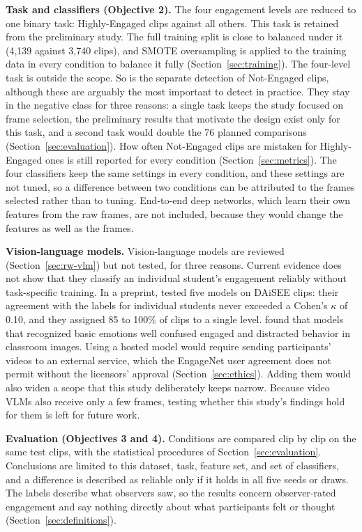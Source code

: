 \textbf{Task and classifiers (Objective 2).} The four engagement levels are reduced to one binary task: Highly-Engaged clips against all others. This task is retained from the preliminary study. The full training split is close to balanced under it (4,139 against 3,740 clips), and SMOTE oversampling \cite{chawla2002} is applied to the training data in every condition to balance it fully (Section~\ref{sec:training}). The four-level task is outside the scope. So is the separate detection of Not-Engaged clips, although these are arguably the most important to detect in practice. They stay in the negative class for three reasons: a single task keeps the study focused on frame selection, the preliminary results that motivate the design exist only for this task, and a second task would double the 76 planned comparisons (Section~\ref{sec:evaluation}). How often Not-Engaged clips are mistaken for Highly-Engaged ones is still reported for every condition (Section~\ref{sec:metrics}). The four classifiers keep the same settings in every condition, and these settings are not tuned, so a difference between two conditions can be attributed to the frames selected rather than to tuning. End-to-end deep networks, which learn their own features from the raw frames, are not included, because they would change the features as well as the frames.

\textbf{Vision-language models.} Vision-language models are reviewed (Section~\ref{sec:rw-vlm}) but not tested, for three reasons. Current evidence does not show that they classify an individual student's engagement reliably without task-specific training. In a preprint,  tested five models on DAiSEE clips: their agreement with the labels for individual students never exceeded a Cohen's $\kappa$ of 0.10, and they assigned 85 to 100\% of clips to a single level.  found that models that recognized basic emotions well confused engaged and distracted behavior in classroom images. Using a hosted model would require sending participants' videos to an external service, which the EngageNet user agreement does not permit without the licensors' approval (Section~\ref{sec:ethics}). Adding them would also widen a scope that this study deliberately keeps narrow. Because video VLMs also receive only a few frames, testing whether this study's findings hold for them is left for future work.

\textbf{Evaluation (Objectives 3 and 4).} Conditions are compared clip by clip on the same test clips, with the statistical procedures of Section~\ref{sec:evaluation}. Conclusions are limited to this dataset, task, feature set, and set of classifiers, and a difference is described as reliable only if it holds in all five seeds or draws. The labels describe what observers saw, so the results concern observer-rated engagement and say nothing directly about what participants felt or thought (Section~\ref{sec:definitions}).

